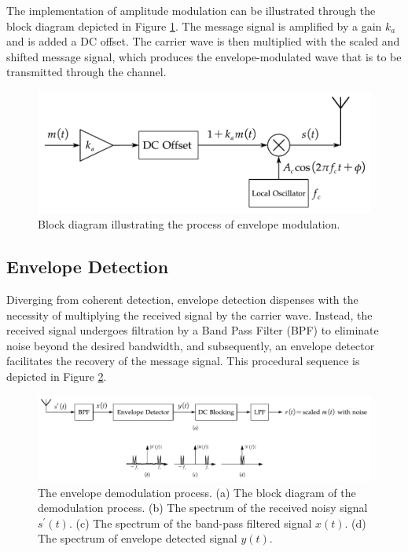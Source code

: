 \documentclass[../ECE459FinalProjectReport.tex]{subfiles}
\begin{document}
The implementation of amplitude modulation can be illustrated through the block diagram depicted in Figure \ref{fig:env-mod}. The message signal is amplified by a gain $k_a$ and is added a DC offset. The carrier wave is then multiplied with the scaled and shifted message signal, which produces the envelope-modulated wave that is to be transmitted through the channel.
\begin{figure}[tb]
    \centering
    \includegraphics[scale=0.5]{plots/env_mod.pdf}
    \caption{Block diagram illustrating the process of envelope modulation.}
    \label{fig:env-mod}
\end{figure}

\subsection{Envelope Detection}
Diverging from coherent detection, envelope detection dispenses with the necessity of multiplying the received signal by the carrier wave. Instead, the received signal undergoes filtration by a Band Pass Filter (BPF) to eliminate noise beyond the desired bandwidth, and subsequently, an envelope detector facilitates the recovery of the message signal. This procedural sequence is depicted in Figure \ref{fig:env-demod}.
\begin{figure}[tb]
    \centering
    \includegraphics[width=\linewidth]{plots/env-demod.pdf}
    \caption{The envelope demodulation process. (a) The block diagram of the demodulation process. (b) The spectrum of the received noisy signal $s^\prime (t)$. (c) The spectrum of the band-pass filtered signal $x(t)$. (d) The spectrum of envelope detected signal $y(t)$.}
    \label{fig:env-demod}
\end{figure}
\end{document}

